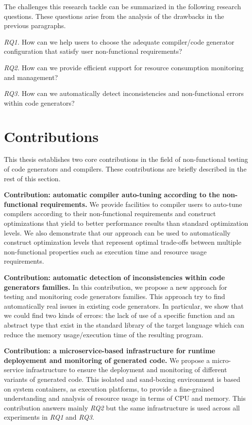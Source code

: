 The challenges this research tackle can be summarized in the following research
questions. These questions arise from the analysis of the drawbacks in the previous paragraphs.

\textit{RQ1.} How can we help users to choose the adequate compiler/code generator configuration that satisfy user non-functional requirements?

\textit{RQ2.} How can we provide efficient support for resource consumption monitoring and management?

\textit{RQ3.} How can we automatically detect inconsistencies and non-functional errors within code generators?



\section{Contributions}
This thesis establishes two core contributions in the field of non-functional testing of code generators and compilers. 
These contributions are briefly described in the rest of this section.

\textbf{Contribution: automatic compiler auto-tuning according to the non-functional requirements.}
We provide facilities to compiler users to auto-tune compilers according to their non-functional requirements and construct optimizations that
yield to better performance results than standard optimization levels. We also demonstrate that our approach can be used to automatically construct optimization levels that represent optimal trade-offs between multiple non-functional properties such as execution time and resource usage requirements.

\textbf{Contribution: automatic detection of inconsistencies within code generators families.}
In this contribution, we propose a new approach for testing and
monitoring code generators families. This approach try to find automatically real issues in existing code generators. In particular, we show that we could find two kinds of errors: the lack of use of a specific function and an abstract type that exist in the standard library of the target language which can reduce the memory usage/execution time of the resulting program.

\textbf{Contribution: a microservice-based infrastructure for runtime deployement and monitoring of generated code.}
We propose a micro-service infrastructure to ensure the deployment and monitoring of different variants of generated code. This isolated and sand-boxing environment is based on system containers, as execution platforms, to provide a fine-grained understanding and analysis of resource usage in terms of CPU and memory. This contribution answers mainly \textit{RQ2} but the same infrastructure is used across all experiments in \textit{RQ1} and \textit{RQ3}.

